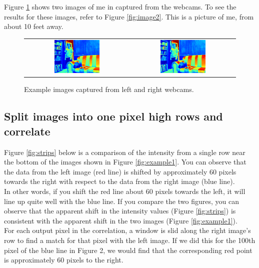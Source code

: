 \documentclass[11pt,fleqn]{article}
\begin{document}
Figure \ref{fig:image1} shows two images of me in captured from the webcams. To see the results for these images, refer to Figure \ref{fig:image2}.
This is a picture of me, from about 10 feet away.\\

\begin{figure}[!h]
\begin{mdframed}
\centering
\setlength{}
\begin{tabular}{cc}
\includegraphics[width=0.45\textwidth]{images/l.png} &
\includegraphics[width=0.45\textwidth]{images/r.png} \\[2pt]
\end{tabular}
\caption[Example images captured from webcams]{Example images captured from left and right webcams.}
\label{fig:image1}
\end{mdframed}
\end{figure}

\subsection{Split images into one pixel high rows and correlate}

Figure \ref{fig:strips} below is a comparison of the intensity from a single row near the bottom of the images shown in Figure \ref{fig:example1}. You can observe that the data from the left image (red line) is shifted by approximately 60 pixels towards the right with respect to the data from the right image (blue line).\\[5pt]
%
In other words, if you shift the red line about 60 pixels towards the left, it will line up quite well with the blue line. If you compare the two figures, you can observe that the apparent shift in the intensity values (Figure \ref{fig:strips}) is consistent with the apparent shift in the two images (Figure \ref{fig:example1}). \\[5pt]
%
For each output pixel in the correlation, a window is slid along the right image's row to find a match for that pixel with the left image. If we did this for the 100th pixel of the blue line in Figure 2, we would find that the corresponding red point is approximately 60 pixels to the right.\\
\end{document}
